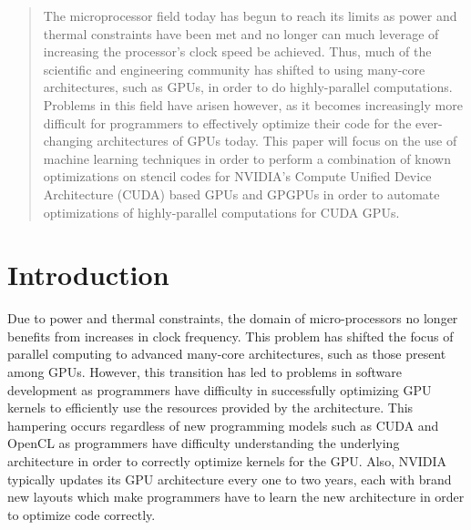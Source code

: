 \documentclass[conference]{IEEEtran}
\begin{document}
\begin{abstract}
The microprocessor field today has begun to reach its limits as power and thermal constraints have been met and no longer can much leverage
of increasing the processor's clock speed be achieved. Thus, much of the scientific and engineering community has shifted to using many-core
architectures, such as GPUs, in order to do highly-parallel computations. Problems in this field have arisen however, as it becomes increasingly
more difficult for programmers to effectively optimize their code for the ever-changing architectures of GPUs today.
This paper will focus on the use of machine learning techniques in order to perform a combination of known optimizations on stencil codes for
NVIDIA's Compute Unified Device Architecture (CUDA) based GPUs and GPGPUs in order to automate optimizations of highly-parallel computations
for CUDA GPUs.

\end{abstract}





%
\IEEEpeerreviewmaketitle



\section{Introduction}
Due to power and thermal constraints, the domain of micro-processors no longer benefits from increases in clock frequency\cite{Datta}.
This problem has shifted the focus of parallel computing to advanced many-core architectures, such as those present among GPUs.
However, this transition has led to problems in software development as programmers have difficulty in successfully optimizing
GPU kernels to efficiently use the resources provided by the architecture. This hampering occurs regardless of new programming models
such as CUDA and OpenCL as programmers have difficulty understanding the underlying architecture in order to correctly optimize kernels
for the GPU\cite{Zhang}. Also, NVIDIA typically updates its GPU architecture every one to two years, each with brand new layouts which
make programmers have to learn the new architecture in order to optimize code correctly.
\end{document}
